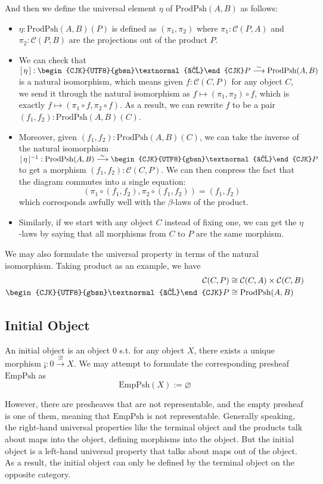 \documentclass[12pt]{article}
\theoremstyle{definition}
\theoremstyle{remark}
\newcommand{\cat}[1]{\mathcal{#1}}
\newcommand{\yo}{\begin{CJK}{UTF8}{gbsn}\textnormal{よ}\end{CJK}}
\newcommand{\yotrans}[1]{\lbrack\,#1\,\rbrack}
\newcommand{\natiso}{\overset{\sim}{\longrightarrow}}
\begin{document}
And then we define the universal element $\eta$ of $\mathrm{ProdPsh}(A, B)$ as follows:
\begin{itemize}
  \item $\eta: \mathrm{ProdPsh}(A, B)(P)$ is defined as $(\pi_1, \pi_2)$ where $\pi_1: \cat{C}(P, A)$ and $\pi_2: \cat{C}(P, B)$ are the projections out of the product $P$.
  \item We can check that $\yotrans{\eta}: \yo P \natiso \mathrm{ProdPsh}(A, B)$ is a natural isomorphism, which means given $f: \cat{C}(C, P)$ for any object $C$, we send it through the natural isomorphism as $f \mapsto (\pi_1, \pi_2) \circ f$, which is exactly $f \mapsto (\pi_1 \circ f, \pi_2 \circ f)$. As a result, we can rewrite $f$ to be a pair $(f_1, f_2): \mathrm{ProdPsh}(A, B)(C)$.
  \item Moreover, given $(f_1, f_2): \mathrm{ProdPsh}(A, B)(C)$, we can take the inverse of the natural isomorphism $\yotrans{\eta}^{-1}: \mathrm{ProdPsh}(A, B) \natiso \yo P$ to get a morphism $(f_1, f_2): \cat{C}(C, P)$. We can then conpress the fact that the diagram commutes into a single equation:
  $$
    (\pi_1 \circ (f_1, f_2), \pi_2 \circ (f_1, f_2)) = (f_1, f_2)
  $$
  which corresponds awfully well with the $\beta$-laws of the product.
  \item Similarly, if we start with any object $C$ instead of fixing one, we can get the $\eta$-laws by saying that all morphisms from $C$ to $P$ are the same morphism.
\end{itemize}
We may also formulate the universal property in terms of the natural isomorphism. Taking product as an example, we have
\begin{align*}
  \cat{C}(C, P) &\cong \cat{C}(C, A) \times \cat{C}(C, B) \\
  \yo P &\cong \mathrm{ProdPsh}(A, B)
\end{align*}


\subsection*{Initial Object}

An initial object is an object $0$ s.t. for any object $X$, there exists a unique morphism $\text{¡} : 0 \overset{\exists!}{\to} X$.
We may attempt to formulate the corresponding presheaf $\mathrm{EmpPsh}$ as
$$
\mathrm{EmpPsh}(X) := \varnothing
$$

However, there are presheaves that are not representable, and the empty presheaf is one of them, meaning that $\mathrm{EmpPsh}$ is not representable. Generally speaking, the right-hand universal properties like the terminal object and the products talk about maps into the object, defining morphisms into the object. But the initial object is a left-hand universal property that talks about maps out of the object.
As a result, the initial object can only be defined by the terminal object on the opposite category.
\end{document}
